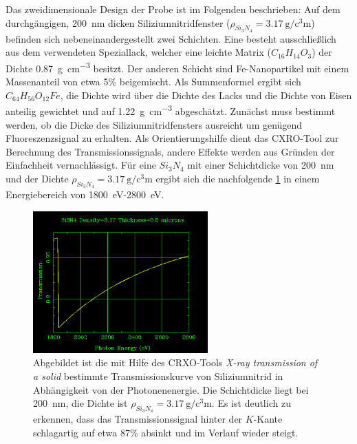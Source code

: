 Das zweidimensionale Design der Probe ist im Folgenden beschrieben: Auf dem durch\-gäng\-igen, \SI{200}{\nano\meter} dicken Siliziumnitridfenster ($\rho_{Si_{3}N_{4}}=\SI{3.17}{\gram\per\cubic\centi\meter}$) befinden sich nebeneinandergestellt zwei Schichten. Eine besteht ausschließlich aus dem verwendeten Speziallack, welcher eine leichte Matrix ($C_{16}H_{14}O_{3}$) der Dichte \SI{0.87}{\gram\per\cubic\centi\meter} besitzt. Der anderen Schicht sind Fe-Nanopartikel mit einem Massenanteil von etwa 5\% beigemischt. Als Summenformel ergibt sich $C_{64}H_{56}O_{12}Fe$, die Dichte wird über die Dichte des Lacks und die Dichte von Eisen anteilig gewichtet und auf \SI{1.22}{\gram\per\cubic\centi\meter} abgeschätzt.\newline
Zunächst muss bestimmt werden, ob die Dicke des Siliziumnitridfensters ausreicht um genügend Fluoreszenzsignal zu erhalten. Als Orientierungshilfe dient das CXRO-Tool zur Berechnung des Transmissionssignals, andere Effekte werden aus Gründen der Einfachheit vernachlässigt. Für eine $Si_{3}N_{4}$ mit einer Schichtdicke von \SI{200}{\nano\meter} und der Dichte $\rho_{Si_{3}N_{4}}=\SI{3.17}{\gram\per\cubic\centi\meter}$ ergibt sich die nachfolgende \cref{fig:si3n4} in einem Energiebereich von \SI{1800}{\electronvolt}-\SI{2800}{\electronvolt}.
\begin{figure}[H] 
  \centering
     \includegraphics[width=0.6\textwidth]{illustrations/si3n4.png}
  \caption[Transmission durch Siliziumnitridfenster]{Abgebildet ist die mit Hilfe des CRXO-Tools \textit{X-ray transmission of a solid} bestimmte Transmissionskurve von Siliziumnitrid in Abhängigkeit von der Photonenenergie. Die Schichtdicke liegt bei \SI{200}{\nano\meter}, die Dichte ist $\rho_{Si_{3}N_{4}}=\SI{3.17}{\gram\per\cubic\centi\meter}$. Es ist deutlich zu erkennen, dass das Transmissionssignal hinter der $K$-Kante schlagartig auf etwa 87\% absinkt und im Verlauf wieder steigt.}
  \label{fig:si3n4}
\end{figure}
